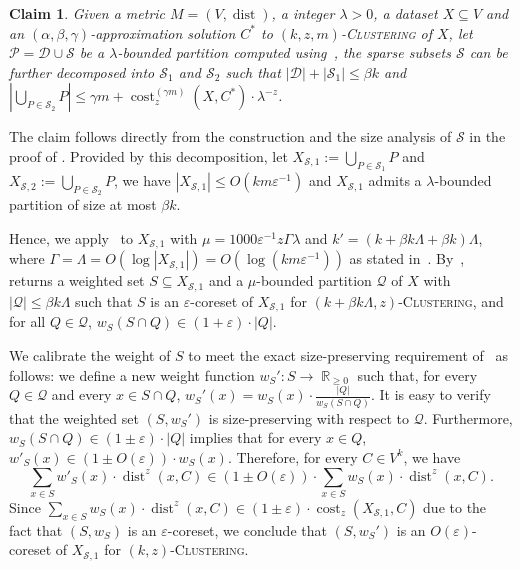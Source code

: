 \documentclass[letterpaper,11pt]{article}
\theoremstyle{plain}
\newtheorem{claim}[theorem]{Claim}
\theoremstyle{definition}
\theoremstyle{remark}
\DeclareMathOperator{\R}{\mathbb{R}}
\DeclareMathOperator{\cost}{cost}
\DeclareMathOperator{\dist}{dist}
\newcommand{\eps}{\varepsilon}
\newcommand{\calD}{\mathcal{D}}
\newcommand{\calP}{\mathcal{P}}
\newcommand{\calQ}{\mathcal{Q}}
\newcommand{\calS}{\mathcal{S}}
\newcommand{\ProblemName}[1]{\textsc{#1}}
\newcommand{\kzC}{\ProblemName{$(k,z)$-Clustering}\xspace}
\newcommand{\tzC}[1]{\ProblemName{$(#1,z)$-Clustering}\xspace}
\newcommand{\kzmC}{\ProblemName{$(k,z,m)$-Clustering}\xspace}
\begin{document}
\begin{claim}
    \label{claim:refined decopmosition}
    Given a metric $M=(V,\dist)$, a integer $\lambda >0$, a dataset $X\subseteq V$ and an $(\alpha,\beta,\gamma)$-approximation solution $C^*$ to \kzmC of $X$, let $\calP=\calD\cup\calS$ be a $\lambda$-bounded partition computed using~, the sparse subsets $\calS$ can be further decomposed into $\calS_{1}$ and $\calS_{2}$ such that $|\calD| + |\calS_1|\le \beta k$ and $|\bigcup_{P\in\calS_2} P|\le \gamma m + \cost_z^{(\gamma m)}(X,C^*)\cdot \lambda^{-z}$.
\end{claim}
The claim follows directly from the construction and the size analysis of $\calS$ in the proof of . Provided by this decomposition, let $X_{\calS,1}:=\bigcup_{P\in\calS_1} P$ and $X_{\calS,2}:=\bigcup_{P\in\calS_2} P$, we have $|X_{\calS,1}|\le O(km\eps^{-1})$ and $X_{\calS,1}$ admits a $\lambda$-bounded partition of size at most $\beta k$. 


Hence, we apply~ to $X_{\calS,1}$ with $\mu = 1000\eps^{-1}z\Gamma\lambda$ and $k' = (k + \beta k\Lambda + \beta k)\Lambda$, where $\Gamma = \Lambda = O(\log |X_{\calS,1}|) = O(\log(km\eps^{-1}))$ as stated in~. By~,~ returns a weighted set $S\subseteq X_{\calS,1}$ and a $\mu$-bounded partition $\calQ$ of $X$ with $|\calQ|\le \beta k\Lambda$ such that $S$ is an $\eps$-coreset of $X_{\calS,1}$ for \tzC{k+\beta k\Lambda}, and for all $Q\in \calQ$, $w_S(S\cap Q)\in (1+\eps)\cdot |Q|$.

We calibrate the weight of $S$ to meet the exact size-preserving requirement of~ as follows: we define a new weight function $w_S':S\to \R_{\geq 0}$ such that, for every $Q\in\calQ$ and every $x\in S\cap Q$, $w_S'(x) = w_S(x)\cdot \frac{|Q|}{w_S(S\cap Q)}$. It is easy to verify that the weighted set $(S,w_{S}')$ is size-preserving with respect to $\calQ$. Furthermore, $w_S(S\cap Q)\in (1\pm \eps)\cdot |Q|$ implies that for every $x\in Q$, $w'_S(x)\in (1\pm O(\eps))\cdot w_S(x)$.
Therefore, for every $C\in V^k$, we have
\begin{equation*}
    \sum_{x\in S}w'_S(x)\cdot \dist^z(x,C) \in (1\pm O(\eps))\cdot \sum_{x\in S}w_S(x)\cdot \dist^z(x,C).
\end{equation*}
Since $\sum_{x\in S}w_S(x)\cdot \dist^z(x,C)\in (1\pm \eps)\cdot \cost_z(X_{\calS,1},C)$ due to the fact that $(S,w_S)$ is an $\eps$-coreset, we conclude that $(S,w_S')$ is an $O(\eps)$-coreset of $X_{\calS,1}$ for \kzC. 
\end{document}
